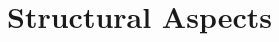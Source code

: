 \chapter{Structural Aspects}\label{ch:structural_aspects}



%
\newpage
% 
% 
% 
% 

%















